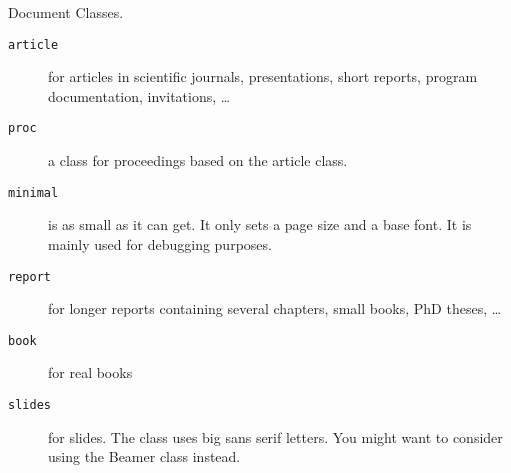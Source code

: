 \begin{table}[!bp]
\caption{Document Classes.} \label{documentclasses}
\begin{lined}{\textwidth}
\begin{description}

\item [\normalfont\texttt{article}] for articles in scientific journals, presentations,
  short reports, program documentation, invitations, \ldots
\item [\normalfont\texttt{proc}] a class for proceedings based on the article class.
\item [\normalfont\texttt{minimal}] is as small as it can get.
It only sets a page size and a base font. It is mainly used for debugging
purposes.
\item [\normalfont\texttt{report}] for longer reports containing several chapters, small
  books, PhD theses, \ldots {}
\item [\normalfont\texttt{book}] for real books 
\item [\normalfont\texttt{slides}] for slides. The class uses big sans serif
  letters. You might want to consider using the Beamer class instead.
\end{description}
\end{lined}
\end{table}

